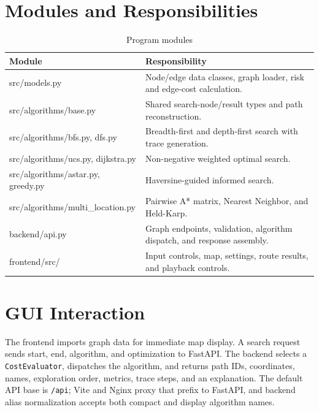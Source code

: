 \documentclass[12pt,a4paper,oneside]{report}
\newcommand{\code}[1]{\texttt{#1}}
\begin{document}
\section{Modules and Responsibilities}
\begin{table}[H]
\centering
\caption{Program modules}
\label{tab:modules}
\small
\begin{tabularx}{\textwidth}{>{\raggedright\arraybackslash\ttfamily\footnotesize}p{5.3cm}X}
\toprule
\textbf{Module} & \textbf{Responsibility}\\
\midrule
src/models.py & Node/edge data classes, graph loader, risk and edge-cost calculation.\\
src/algorithms/base.py & Shared search-node/result types and path reconstruction.\\
src/algorithms/\newline bfs.py, dfs.py & Breadth-first and depth-first search with trace generation.\\
src/algorithms/\newline ucs.py, dijkstra.py & Non-negative weighted optimal search.\\
src/algorithms/\newline astar.py, greedy.py & Haversine-guided informed search.\\
src/algorithms/\newline multi\_location.py & Pairwise A* matrix, Nearest Neighbor, and Held-Karp.\\
backend/api.py & Graph endpoints, validation, algorithm dispatch, and response assembly.\\
frontend/src/ & Input controls, map, settings, route results, and playback controls.\\
\bottomrule
\end{tabularx}
\end{table}

\section{GUI Interaction}
The frontend imports graph data for immediate map display. A search request
sends start, end, algorithm, and optimization to FastAPI. The backend
selects a \code{CostEvaluator}, dispatches the algorithm, and returns path IDs,
coordinates, names, exploration order, metrics, trace steps, and an explanation.
The default API base is \code{/api}; Vite and Nginx proxy that prefix to FastAPI,
and backend alias normalization accepts both compact and display algorithm names.
\end{document}

